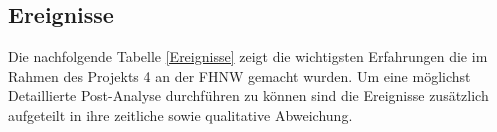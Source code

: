 \subsection{Ereignisse}
Die nachfolgende Tabelle \ref{Ereignisse} zeigt die wichtigsten Erfahrungen die im Rahmen des Projekts 4 an der FHNW gemacht wurden. Um eine möglichst Detaillierte Post-Analyse durchführen zu können sind die Ereignisse zusätzlich aufgeteilt in ihre zeitliche sowie qualitative Abweichung. 

\begin{table}[h]
\centering
\caption{Ereignisse}
\label{Ereignisse}
\end{table}
